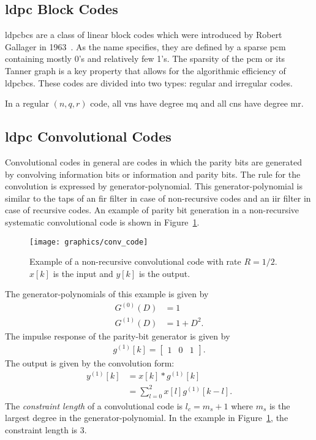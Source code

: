 \subsection{\acrlong{ldpc} Block Codes}
\glspl{ldpcbc} are a class of linear block codes which were introduced by Robert Gallager in 1963~\cite{Gallager1963}. As the name specifies, they are defined by a sparse \gls{pcm} containing mostly 0's and relatively few 1's. The sparsity of the \gls{pcm} or its Tanner graph is a key property that allows for the algorithmic efficiency of \glspl{ldpcbc}. These codes are divided into two types: regular and irregular codes.

In a regular $(n,q,r)$ code, all \glspl{vn} have degree \gls{mq} and all \glspl{cn} have degree \gls{mr}.

\subsection{\acrlong{ldpc} Convolutional Codes}
Convolutional codes in general are codes in which the parity bits are generated by convolving information bits or information and parity bits. The rule for the convolution is expressed by generator-polynomial. This generator-polynomial is similar to the taps of an \gls{fir} filter in case of non-recursive codes and an \gls{iir} filter in case of recursive codes. An example of parity bit generation in a non-recursive systematic convolutional code is shown in Figure~\ref{fig:conv_code}.
\begin{figure}[htbp]
  \centering
  \texttt{[image: graphics/conv\_code]}
  \caption{Example of a non-recursive convolutional code with rate $R=1/2$. $x[k]$ is the input and $y[k]$ is the output.}
  \label{fig:conv_code}
\end{figure}
The generator-polynomials of this example is given by
\begin{align}
G^{(0)}(D)&=1\\
G^{(1)}(D)&=1+D^2.
\end{align}
The impulse response of the parity-bit generator is given by
\begin{align}g^{(1)}[k]=\begin{bmatrix}
1 &0 &1
\end{bmatrix}.\end{align}
The output is given by the convolution form:
\begin{align}
y^{(1)}[k]&=x[k]*g^{(1)}[k]\nonumber\\
&=\sum_{l=0}^{2}x[l]g^{(1)}[k-l].
\end{align}
The \emph{constraint length} of a convolutional code is $l_c=m_s+1$ where $m_s$ is the largest degree in the generator-polynomial. In the example in Figure~\ref{fig:conv_code}, the constraint length is 3.

